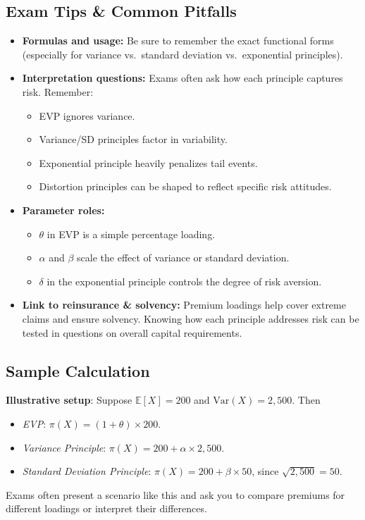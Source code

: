 \documentclass[13pt,a4paper]{article}
\begin{document}
\subsection{Exam Tips \& Common Pitfalls}
\begin{itemize}
  \item \textbf{Formulas and usage:} Be sure to remember the exact functional forms (especially for variance vs.\ standard deviation vs.\ exponential principles).
  \item \textbf{Interpretation questions:} Exams often ask how each principle captures risk. Remember:
    \begin{itemize}
      \item EVP ignores variance.
      \item Variance/SD principles factor in variability.
      \item Exponential principle heavily penalizes tail events.
      \item Distortion principles can be shaped to reflect specific risk attitudes.
    \end{itemize}
  \item \textbf{Parameter roles:} 
    \begin{itemize}
      \item \(\theta\) in EVP is a simple percentage loading.
      \item \(\alpha\) and \(\beta\) scale the effect of variance or standard deviation.
      \item \(\delta\) in the exponential principle controls the degree of risk aversion.
    \end{itemize}
  \item \textbf{Link to reinsurance \& solvency:} Premium loadings help cover extreme claims and ensure solvency. Knowing how each principle addresses risk can be tested in questions on overall capital requirements.
\end{itemize}

\subsection{Sample Calculation}
\textbf{Illustrative setup}: Suppose \(\mathbb{E}[X] = 200\) and \(\mathrm{Var}(X)=2{,}500\). Then
\begin{itemize}
  \item \emph{EVP}: \(\pi(X) = (1 + \theta)\times 200\).
  \item \emph{Variance Principle}: \(\pi(X) = 200 + \alpha\times 2{,}500.\)
  \item \emph{Standard Deviation Principle}: \(\pi(X) = 200 + \beta\times 50\), since \(\sqrt{2{,}500} = 50\).
\end{itemize}
Exams often present a scenario like this and ask you to compare premiums for different loadings or interpret their differences.
\end{document}
